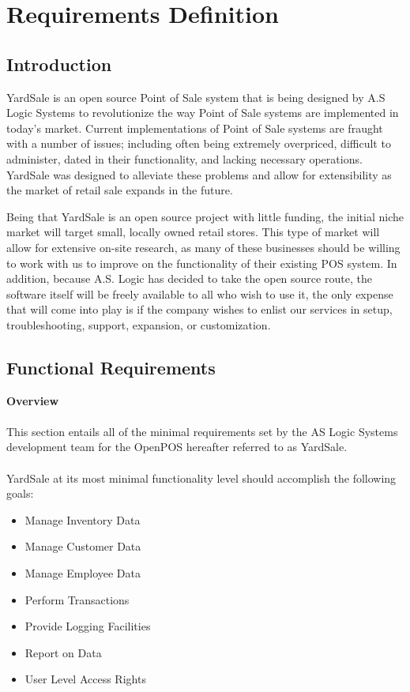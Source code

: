 \documentclass{book}
\title{}
\author{}
\begin{document}
\chapter*{Requirements Definition}

\section{Introduction}

YardSale is an open source Point of Sale system that is being designed by A.S Logic Systems to revolutionize the way Point of Sale systems are implemented in today's market.  Current implementations of Point of Sale systems are fraught with a number of issues; including often being extremely overpriced, difficult to administer, dated in their functionality, and lacking necessary operations.  YardSale was designed to alleviate these problems and allow for extensibility as the market of retail sale expands in the future.

Being that YardSale is an open source project with little funding, the initial niche market will target small, locally owned retail stores.  This type of market will allow for extensive on-site research, as many of these businesses should be willing to work with us to improve on the functionality of their existing POS system.  In addition, because A.S. Logic has decided to take the open source route, the software itself will be freely available to all who wish to use it, the only expense that will come into play is if the company wishes to enlist our services in setup, troubleshooting, support, expansion, or customization.

\section{Functional Requirements}

\textbf{Overview}\\
\\
This section entails all of the minimal requirements set by the AS Logic Systems development team for the OpenPOS hereafter referred to as YardSale.\\
\\
YardSale at its most minimal functionality level should accomplish the following goals:

\begin{itemize}
	\item {Manage Inventory Data}
	\item {Manage Customer Data}
	\item {Manage Employee Data}
	\item {Perform Transactions}
	\item {Provide Logging Facilities}
	\item {Report on Data}
	\item {User Level Access Rights}
\end{itemize}
\end{document}
